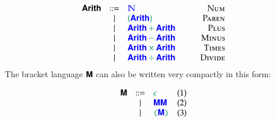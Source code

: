 \documentclass{book}
\begin{document}
\begin{displaymath}
\begin{array}{lclr}
  \sansbold{Arith} & ::= & \meta{\mathbb{N}} &\textsc{Num} \\
                   & |   & \conc{(\meta{\sansbold{Arith}})} & \textsc{Paren}  \\
                   & |   & \conc{\meta{\sansbold{Arith}} + \meta{\sansbold{Arith}}}\quad\quad & \textsc{Plus} \\
                   & |   & \conc{\meta{\sansbold{Arith}} - \meta{\sansbold{Arith}}} & \textsc{Minus} \\
                   & |   & \conc{\meta{\sansbold{Arith}} \times \meta{\sansbold{Arith}}} & \textsc{Times} \\
                   & |   & \conc{\meta{\sansbold{Arith}} \div \meta{\sansbold{Arith}}} & \textsc{Divide} \\
\end{array}
\end{displaymath}
The bracket language $\textsf{\textbf{M}}$ can also be written very compactly in this form:

\begin{displaymath}
\begin{array}{lclr}
  \sansbold{M} & ::= & \conc{\epsilon} & (1) \\
               & |   & \meta{\sansbold{M}} \meta{\sansbold{M}} & (2) \\
               & |   & \mconc{(}\meta{\sansbold{M}}\mconc{)} & (3) \\
\end{array}
\end{displaymath}
\end{document}
